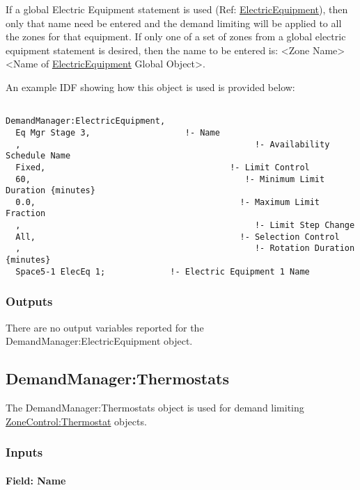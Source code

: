 If a global Electric Equipment statement is used (Ref: \hyperref[electricequipment]{ElectricEquipment}), then only that name need be entered and the demand limiting will be applied to all the zones for that equipment. If only one of a set of zones from a global electric equipment statement is desired, then the name to be entered is: \textless{}Zone Name\textgreater{} \textless{}Name of \hyperref[electricequipment]{ElectricEquipment} Global Object\textgreater{}.

An example IDF showing how this object is used is provided below:

\begin{lstlisting}

DemandManager:ElectricEquipment,
  Eq Mgr Stage 3,                   !- Name
  ,                                               !- Availability Schedule Name
  Fixed,                                     !- Limit Control
  60,                                           !- Minimum Limit Duration {minutes}
  0.0,                                         !- Maximum Limit Fraction
  ,                                               !- Limit Step Change
  All,                                         !- Selection Control
  ,                                               !- Rotation Duration {minutes}
  Space5-1 ElecEq 1;             !- Electric Equipment 1 Name
\end{lstlisting}

\subsubsection{Outputs}\label{outputs-3-003}

There are no output variables reported for the DemandManager:ElectricEquipment object.

\subsection{DemandManager:Thermostats}\label{demandmanagerthermostats}

The DemandManager:Thermostats object is used for demand limiting \hyperref[zonecontrolthermostat]{ZoneControl:Thermostat} objects.

\subsubsection{Inputs}\label{inputs-4-007}

\paragraph{Field: Name}\label{field-name-4-007}

